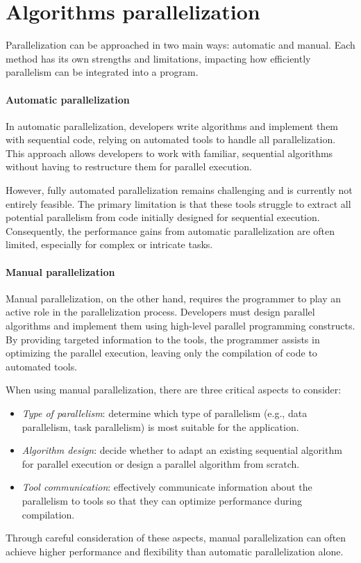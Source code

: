 \section{Algorithms parallelization}

Parallelization can be approached in two main ways: automatic and manual.
Each method has its own strengths and limitations, impacting how efficiently parallelism can be integrated into a program.

\paragraph*{Automatic parallelization}
In automatic parallelization, developers write algorithms and implement them with sequential code, relying on automated tools to handle all parallelization. 
This approach allows developers to work with familiar, sequential algorithms without having to restructure them for parallel execution.

However, fully automated parallelization remains challenging and is currently not entirely feasible. 
The primary limitation is that these tools struggle to extract all potential parallelism from code initially designed for sequential execution. 
Consequently, the performance gains from automatic parallelization are often limited, especially for complex or intricate tasks.

\paragraph*{Manual parallelization}
Manual parallelization, on the other hand, requires the programmer to play an active role in the parallelization process. 
Developers must design parallel algorithms and implement them using high-level parallel programming constructs. 
By providing targeted information to the tools, the programmer assists in optimizing the parallel execution, leaving only the compilation of code to automated tools.

When using manual parallelization, there are three critical aspects to consider:
\begin{itemize} 
    \item \textit{Type of parallelism}: determine which type of parallelism (e.g., data parallelism, task parallelism) is most suitable for the application. 
    \item \textit{Algorithm design}: decide whether to adapt an existing sequential algorithm for parallel execution or design a parallel algorithm from scratch. 
    \item \textit{Tool communication}: effectively communicate information about the parallelism to tools so that they can optimize performance during compilation. 
\end{itemize}
Through careful consideration of these aspects, manual parallelization can often achieve higher performance and flexibility than automatic parallelization alone.

